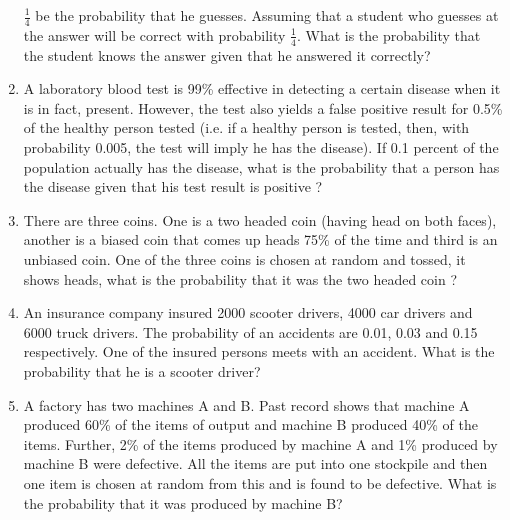 \begin{enumerate}[label=\thesubsection.\arabic*,ref=\thesubsection.\theenumi]
$\frac{1}{4}$
be the probability that he guesses. Assuming that a student who guesses at the
answer will be correct with probability
$\frac{1}{4}$. What is the probability that the student knows the answer given that he answered it correctly?
\\
\solution
%
\item A laboratory blood test is 99\% effective in detecting a certain disease when it is
in fact, present. However, the test also yields a false positive result for 0.5\% of
the healthy person tested (i.e. if a healthy person is tested, then, with probability
0.005, the test will imply he has the disease). If 0.1 percent of the population
actually has the disease, what is the probability that a person has the disease
given that his test result is positive ?
\\
\solution
%
\item There are three coins. One is a two headed coin (having head on both faces),
another is a biased coin that comes up heads 75\% of the time and third is an
unbiased coin. One of the three coins is chosen at random and tossed, it shows
heads, what is the probability that it was the two headed coin ?
\\
\solution
%

\item An insurance company insured 2000 scooter drivers, 4000 car drivers and 6000
truck drivers. The probability of an accidents are 0.01, 0.03 and 0.15 respectively.
One of the insured persons meets with an accident. What is the probability that
he is a scooter driver?
\item A factory has two machines A and B. Past record shows that machine A produced
60\% of the items of output and machine B produced 40\% of the items. Further,
2\% of the items produced by machine A and 1\% produced by machine B were
defective. All the items are put into one stockpile and then one item is chosen at
random from this and is found to be defective. What is the probability that it was
produced by machine B?


\end{enumerate}
